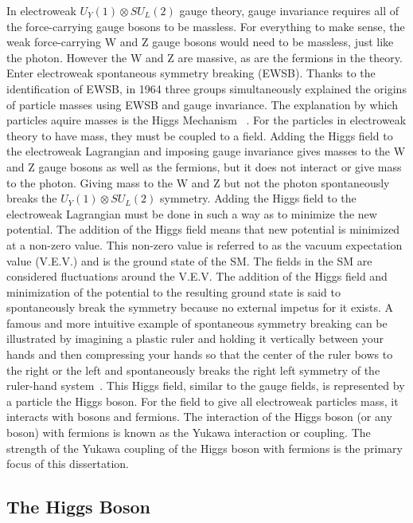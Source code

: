 In electroweak $U_{Y}(1) \otimes SU_{L}(2)$ gauge theory, gauge invariance requires all of the force-carrying gauge bosons to be massless.
For everything to make sense, the weak force-carrying W and Z gauge bosons would need to be massless, just like the photon. 
However the W and Z are massive, as are the fermions in the theory. Enter electroweak spontaneous symmetry breaking (EWSB). Thanks to the identification of EWSB, in 1964 
three groups simultaneously explained the origins of particle masses using EWSB and gauge invariance. The explanation by which particles aquire masses is
the Higgs Mechanism ~\cite{higgs}.
For the particles in electroweak theory to have mass, they must be coupled to a field.
Adding the Higgs field to the electroweak Lagrangian and imposing gauge invariance gives masses to the W and Z gauge bosons as well as the fermions, but it does not interact
or give mass to the photon. Giving mass to the W and Z but not the photon spontaneously breaks the $U_{Y}(1) \otimes SU_{L}(2)$ symmetry.
Adding the Higgs field to the electroweak Lagrangian must be done in such a way as to minimize the new potential. The addition of the Higgs field means that new potential
is minimized at a non-zero value. This non-zero value is referred to as the vacuum expectation value (V.E.V.) and is the ground state of the SM.
The fields in the SM are considered fluctuations around the V.E.V. The addition of the Higgs field and minimization of the potential to the resulting ground state
is said to spontaneously break the symmetry because no external impetus for it exists. A famous and more intuitive example of spontaneous symmetry breaking can be illustrated
by imagining a plastic ruler and holding it vertically between your hands and then compressing your hands so that the center of the ruler bows to the right or the left and
spontaneously breaks the right left symmetry of the ruler-hand system~\cite{robinson}. 
This Higgs field, similar to the gauge fields, is represented by a particle the Higgs boson.
For the field to give all electroweak particles mass, it interacts with bosons and fermions.
The interaction of the Higgs boson (or any boson) with fermions is known as the Yukawa interaction or coupling. The strength of the Yukawa coupling
of the Higgs boson with fermions is the primary focus of this dissertation. 

\subsection{The Higgs Boson}

